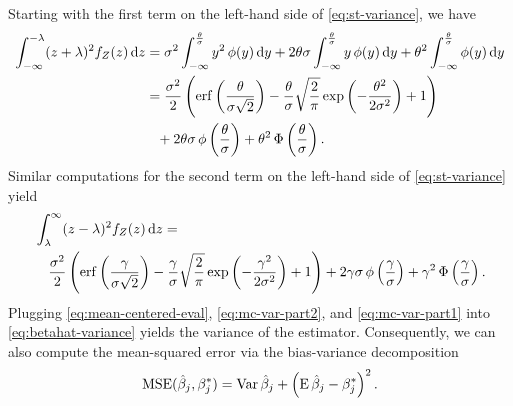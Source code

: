 Starting with the first term on the left-hand side of \eqref{eq:st-variance}, we have
\begin{equation}
  \label{eq:mc-var-part1}
  \begin{aligned}
    \int_{-\infty}^{-\lambda}(z+ \lambda)^2 f_Z(z) \mathop{}\!\mathrm{d} z & = \sigma^2 \int_{-\infty}^{\frac{\theta}{\sigma}} y^2 \operatorname{\phi}(y) \mathop{}\!\mathrm{d} y + 2 \theta \sigma \int_{-\infty}^{\frac{\theta}{\sigma}} y \operatorname{\phi}(y) \mathop{}\!\mathrm{d} y + \theta^2 \int_{-\infty}^{\frac{\theta}{\sigma}} \operatorname{\phi}(y) \mathop{}\!\mathrm{d} y \\
                                                         & = \frac{\sigma^2}{2} \left( \operatorname{erf}\left(\frac{\theta}{\sigma\sqrt{2}}\right) - \frac{\theta}{\sigma}\sqrt{\frac{2}{\pi}} \exp\left(-\frac{\theta^2}{2\sigma^2}\right) + 1 \right)                              \\
                                                         & \phantom{=} + 2 \theta \sigma \operatorname{\phi} \left(\frac{\theta}{\sigma}\right) + \theta^2 \operatorname{\Phi}\left(\frac{\theta}{\sigma}\right).
  \end{aligned}
\end{equation}
Similar computations for the second term on the left-hand side of \eqref{eq:st-variance} yield
\begin{equation}
  \label{eq:mc-var-part2}
  \begin{multlined}
    \int_{\lambda}^{\infty}(z - \lambda)^2 f_Z(z) \du z = \\
    \frac{\sigma^2}{2} \left( \erf\left(\frac{\gamma}{\sigma\sqrt{2}}\right) - \frac{\gamma}{\sigma}\sqrt{\frac{2}{\pi}} \exp\left(-\frac{\gamma^2}{2\sigma^2}\right) + 1 \right) + 2 \gamma \sigma \pdf \left(\frac{\gamma}{\sigma}\right) + \gamma^2 \cdf\left(\frac{\gamma}{\sigma}\right).
  \end{multlined}
\end{equation}
Plugging \eqref{eq:mean-centered-eval}, \eqref{eq:mc-var-part2}, and \eqref{eq:mc-var-part1} into \eqref{eq:betahat-variance} yields the variance of the estimator. Consequently, we can also compute the mean-squared error via the bias-variance decomposition
\begin{equation}
  \label{eq:betahat-mse}
  \operatorname{MSE} (\hat\beta_j, \beta^*_j) = \operatorname{Var}\hat\beta_j + \left(\operatorname{E} \hat\beta_j - \beta^*_j\right)^2.
\end{equation}



